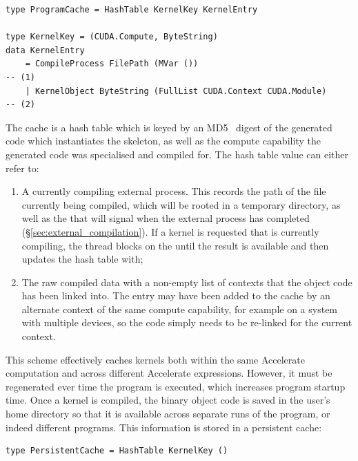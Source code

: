 \begin{lstlisting}[style=haskell,numbers=none]
type ProgramCache = HashTable KernelKey KernelEntry

type KernelKey = (CUDA.Compute, ByteString)
data KernelEntry
    = CompileProcess FilePath (MVar ())                                 -- (1)
    | KernelObject ByteString (FullList CUDA.Context CUDA.Module)       -- (2)
\end{lstlisting}

The cache is a hash table which is keyed by an MD5~\cite{Rivest:1992va} digest
of the generated \CUDA code which instantiates the skeleton, as well as the
compute capability the generated code was specialised and compiled for. The hash
table value can either refer to:
%
\begin{enumerate}
\item A currently compiling external process. This records the path of the file
    currently being compiled, which will be rooted in a temporary directory, as
    well as the  that will signal when the external process has
    completed (\S\ref{sec:external_compilation}). If a kernel is requested that
    is currently compiling, the thread blocks on the  until the
    result is available and then updates the hash table with;

\item The raw compiled data with a non-empty list of \CUDA contexts that the
    object code has been linked into. The entry may have been added to the cache
    by an alternate context of the same compute capability, for example on a
    system with multiple \CUDA devices, so the code simply needs to be
    re-linked for the current context.
\end{enumerate}

This scheme effectively caches kernels both within the same Accelerate
computation and across different Accelerate expressions. However, it must be
regenerated ever time the program is executed, which increases program startup
time. Once a kernel is compiled, the binary object code is saved in the user's
home directory so that it is available across separate runs of the program, or
indeed different programs. This information is stored in a persistent cache:
%
\begin{lstlisting}[style=haskell,numbers=none]
type PersistentCache = HashTable KernelKey ()
\end{lstlisting}

